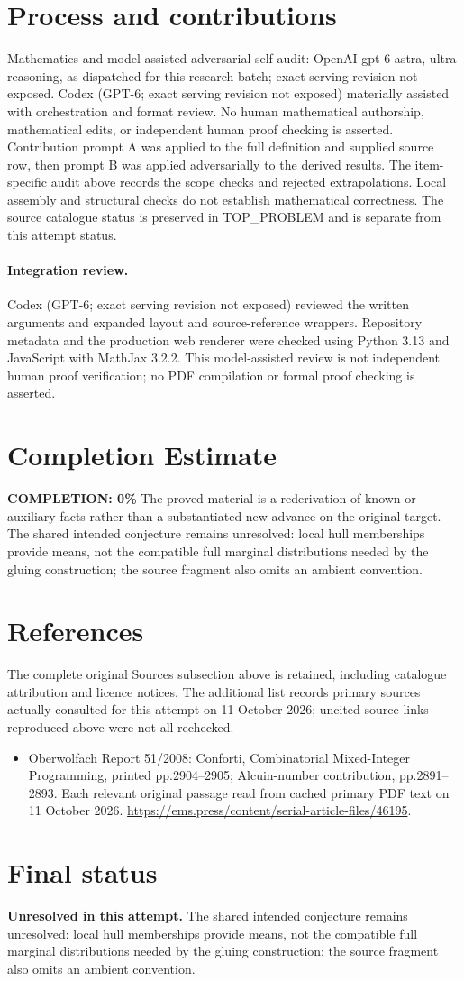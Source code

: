 \documentclass[11pt]{article}
\begin{document}
\section{Process and contributions}
Mathematics and model-assisted adversarial self-audit: OpenAI gpt-6-astra, ultra reasoning, as dispatched for this research batch; exact serving revision not exposed. Codex (GPT-6; exact serving revision not exposed) materially assisted with orchestration and format review. No human mathematical authorship, mathematical edits, or independent human proof checking is asserted.
Contribution prompt A was applied to the full definition and supplied source row, then prompt B was applied adversarially to the derived results. The item-specific audit above records the scope checks and rejected extrapolations. Local assembly and structural checks do not establish mathematical correctness. The source catalogue status is preserved in TOP\_PROBLEM and is separate from this attempt status.
\paragraph{Integration review.} Codex (GPT-6; exact serving revision not exposed) reviewed the written arguments and expanded layout and source-reference wrappers. Repository metadata and the production web renderer were checked using Python 3.13 and JavaScript with MathJax 3.2.2. This model-assisted review is not independent human proof verification; no PDF compilation or formal proof checking is asserted.

\section{Completion Estimate}
\noindent\textbf{COMPLETION: 0\%}
The proved material is a rederivation of known or auxiliary facts rather than a substantiated new advance on the original target. The shared intended conjecture remains unresolved: local hull memberships provide means, not the compatible full marginal distributions needed by the gluing construction; the source fragment also omits an ambient convention.
\section{References}
The complete original Sources subsection above is retained, including catalogue attribution and licence notices. The additional list records primary sources actually consulted for this attempt on 11 October 2026; uncited source links reproduced above were not all rechecked.
\begin{itemize}
\item Oberwolfach Report 51/2008: Conforti, Combinatorial Mixed-Integer Programming, printed pp.2904--2905; Alcuin-number contribution, pp.2891--2893. Each relevant original passage read from cached primary PDF text on 11 October 2026. \url{https://ems.press/content/serial-article-files/46195}.
\end{itemize}
\section{Final status}
\textbf{Unresolved in this attempt.} The shared intended conjecture remains unresolved: local hull memberships provide means, not the compatible full marginal distributions needed by the gluing construction; the source fragment also omits an ambient convention.
\end{document}
